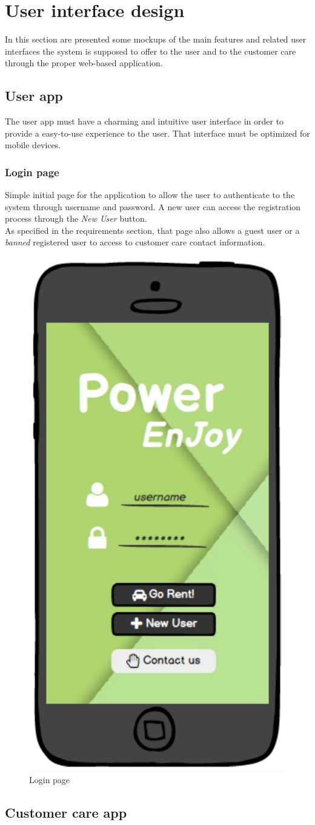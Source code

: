 \section{User interface design}
In this section are presented some mockups of the main features and related user interfaces the system is supposed to offer to the user and to the customer care through the proper web-based application.
\subsection{User app}
The user app must have a charming and intuitive user interface in order to provide a easy-to-use experience to the user. That interface must be optimized for mobile devices.

\subsubsection{Login page}
Simple initial page for the application to allow the user to authenticate to the system through username and password. A new user can access the registration process through the \emph{New User} button. \\
As specified in the requirements section, that page also allows a guest user or a \emph{banned} registered user to access to customer care contact information.

	\begin{figure}[h]
			\centering
			\includegraphics[width=0.4\linewidth]{mockups/loginPage}
			\caption{
				\label{fig:loginPage} 
				Login page
			}
		\end{figure}
		
\subsection{Customer care app}